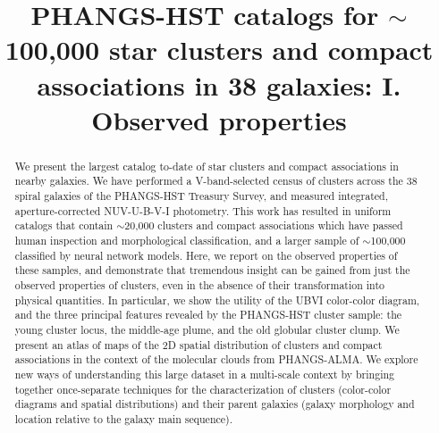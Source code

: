 \documentclass[linenumbers]{aastex63}
\begin{document}
\title{PHANGS-HST catalogs for $\sim$100,000 star clusters and compact associations in 38 galaxies: I. Observed properties}




\begin{abstract}
We present the largest catalog to-date of star clusters and compact associations in nearby galaxies.  We have performed a V-band-selected census of clusters across the 38 spiral galaxies of the PHANGS-HST Treasury Survey, and measured integrated, aperture-corrected NUV-U-B-V-I photometry.
This work has resulted in uniform catalogs that contain $\sim$20,000 clusters and compact associations which have passed human inspection and morphological classification, and a larger sample of $\sim$100,000 classified by neural network models. 
Here, we report on the observed properties of these samples, and demonstrate that tremendous insight can be gained from just the observed properties of clusters, even in the absence of their transformation into physical quantities. 
In particular, we show the utility of the UBVI color-color diagram, and the three principal features revealed by the PHANGS-HST cluster sample: the young cluster locus, the middle-age plume, and the old globular cluster clump.  
We present an atlas of maps of the 2D spatial distribution of clusters and compact associations in the context of the molecular clouds from PHANGS-ALMA.  We explore new ways of understanding this large dataset in a multi-scale context by bringing together once-separate techniques for the characterization of clusters (color-color diagrams and spatial distributions) and their parent galaxies (galaxy morphology and location relative to the galaxy main sequence). 

\end{abstract}
\end{document}
